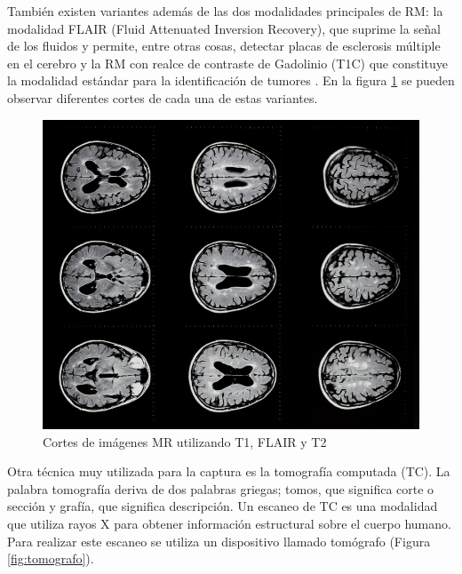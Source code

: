 También existen variantes además de las dos modalidades principales de RM: la modalidad FLAIR (Fluid Attenuated Inversion Recovery), que suprime la señal de los fluidos y permite, entre otras cosas, detectar placas de esclerosis múltiple en el cerebro y la RM con realce de contraste de Gadolinio (T1C) que constituye la modalidad estándar para la identificación de tumores \cite{scarabino2012imaging}. En la figura \ref{fig:mri_cortes} se pueden observar diferentes cortes de cada una de estas variantes.

\begin{figure}[H]
\centering
\includegraphics[scale=1]{images/mri-ms-brain-scan.jpg}
\caption{Cortes de imágenes MR utilizando T1, FLAIR y T2}
\label{fig:mri_cortes}
\end{figure}

Otra técnica muy utilizada para la captura es la tomografía computada (TC). La palabra tomografía deriva de dos palabras griegas; tomos, que significa corte o sección y grafía, que significa descripción. Un escaneo de TC es una modalidad que utiliza rayos X para obtener información estructural sobre el cuerpo humano. Para realizar este escaneo se utiliza un dispositivo llamado tomógrafo (Figura \ref{fig:tomografo}).

